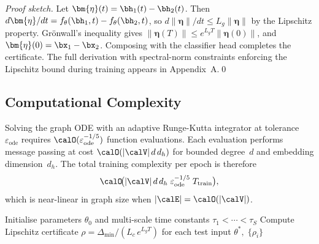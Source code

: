 \noindent\textit{Proof sketch.} Let $\bm{\eta}(t)=\bh_1(t)-\bh_2(t)$. Then $d\bm{\eta}/dt = f_\theta(\bh_1,t)-f_\theta(\bh_2,t)$, so $d\|\bm{\eta}\|/dt\le L_g\|\bm{\eta}\|$ by the Lipschitz property. Gr\"{o}nwall's inequality gives $\|\bm{\eta}(T)\|\le e^{L_g T}\|\bm{\eta}(0)\|$, and $\bm{\eta}(0)=\bx_1-\bx_2$. Composing with the classifier head completes the certificate. The full derivation with spectral-norm constraints enforcing the Lipschitz bound during training appears in Appendix~A.\qed

\subsection{Computational Complexity}

Solving the graph ODE with an adaptive Runge-Kutta integrator at tolerance~$\varepsilon_{\mathrm{ode}}$ requires $\calO(\varepsilon_{\mathrm{ode}}^{-1/5})$ function evaluations. Each evaluation performs message passing at cost $\calO(|\calV|\,d\,d_h)$ for bounded degree~$d$ and embedding dimension~$d_h$. The total training complexity per epoch is therefore
\begin{equation}
\calO\!\bigl(|\calV|\,d\,d_h\;\varepsilon_{\mathrm{ode}}^{-1/5}\;T_{\mathrm{train}}\bigr),
\label{eq:ct_tgnn_complex}
\end{equation}
which is near-linear in graph size when $|\calE|=\calO(|\calV|)$.

\begin{algorithm}[htbp]
\caption{CT-TGNN Training with Adjoint Sensitivity}\label{alg:ct_tgnn}
Initialise parameters $\theta_0$ and multi-scale time constants $\tau_1<\cdots<\tau_S$\;
Compute Lipschitz certificate $\rho = \Delta_{\min}/(L_c\,e^{L_g T})$ for each test input\;
\Return $\theta^*,\;\{\rho_i\}$
\end{algorithm}


